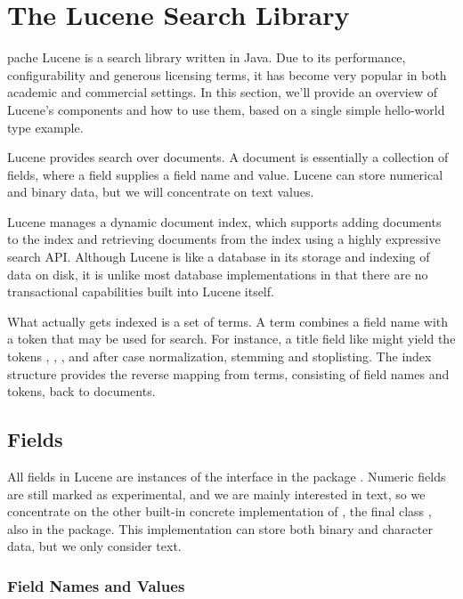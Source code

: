 \chapter{The Lucene Search Library}\label{appendix:lucene}

pache Lucene is a search library written in Java.  Due to
its performance, configurability and generous licensing terms, it has
become very popular in both academic and commercial settings.  In this
section, we'll provide an overview of Lucene's components and how to
use them, based on a single simple hello-world type example.  

Lucene provides search over documents.  A document is essentially a
collection of fields, where a field supplies a field name and value.
Lucene can store numerical and binary data, but we will concentrate
on text values.

Lucene manages a dynamic document index, which supports adding
documents to the index and retrieving documents from the index using a
highly expressive search API.  Although Lucene is like a database in
its storage and indexing of data on disk, it is unlike most database
implementations in that there are no transactional capabilities built
into Lucene itself.

What actually gets indexed is a set of terms.  A term combines a field
name with a token that may be used for search.  For instance, a title
field like  might yield
the tokens , ,
, and  after case
normalization, stemming and stoplisting.  The index structure provides
the reverse mapping from terms, consisting of field names and tokens,
back to documents.


\section{Fields}

All fields in Lucene are instances of the  interface
in the package .  Numeric fields are
still marked as experimental, and we are mainly interested in text, so
we concentrate on the other built-in concrete implementation of
, the final class , also in the
 package.  This implementation can store both binary
and character data, but we only consider text.

\subsection{Field Names and Values}

